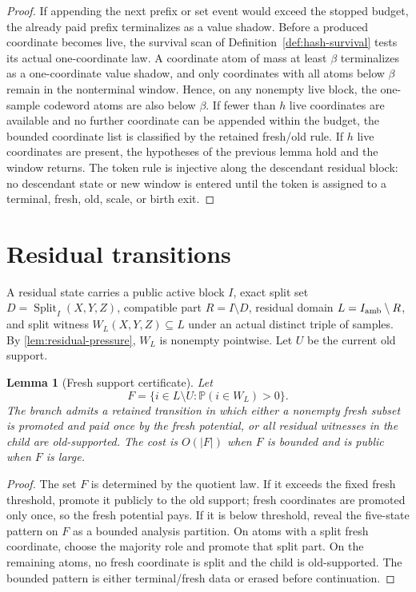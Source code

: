 \documentclass[11pt]{article}
\newcommand{\Cref}[1]{\ref{#1}}
\newtheorem{lemma}[theorem]{Lemma}
\theoremstyle{remark}
\newcommand{\Prob}{\mathbb P}
\newcommand{\Split}{\operatorname{Split}}
\begin{document}
\begin{proof}
If appending the next prefix or set event would exceed the stopped budget, the already paid prefix terminalizes as a value shadow.  Before a produced coordinate becomes live, the survival scan of Definition~\ref{def:hash-survival} tests its actual one-coordinate law.  A coordinate atom of mass at least $\beta$ terminalizes as a one-coordinate value shadow, and only coordinates with all atoms below $\beta$ remain in the nonterminal window.  Hence, on any nonempty live block, the one-sample codeword atoms are also below $\beta$.  If fewer than $h$ live coordinates are available and no further coordinate can be appended within the budget, the bounded coordinate list is classified by the retained fresh/old rule.  If $h$ live coordinates are present, the hypotheses of the previous lemma hold and the window returns.  The token rule is injective along the descendant residual block: no descendant state or new window is entered until the token is assigned to a terminal, fresh, old, scale, or birth exit.
\end{proof}

\section{Residual transitions}\label{app:residual}

A residual state carries a public active block $I$, exact split set $D=\Split_I(X,Y,Z)$, compatible part $R=I\setminus D$, residual domain $L=I_{\rm amb}\setminus R$, and split witness $W_L(X,Y,Z)\subseteq L$ under an actual distinct triple of samples.  By \Cref{lem:residual-pressure}, $W_L$ is nonempty pointwise.  Let $U$ be the current old support.

\begin{lemma}[Fresh support certificate]\label{lem:app-fresh}
Let
\[
        F=\{i\in L\setminus U:\Prob(i\in W_L)>0\}.
\]
The branch admits a retained transition in which either a nonempty fresh subset is promoted and paid once by the fresh potential, or all residual witnesses in the child are old-supported.  The cost is $O(|F|)$ when $F$ is bounded and is public when $F$ is large.
\end{lemma}

\begin{proof}
The set $F$ is determined by the quotient law.  If it exceeds the fixed fresh threshold, promote it publicly to the old support; fresh coordinates are promoted only once, so the fresh potential pays.  If it is below threshold, reveal the five-state pattern on $F$ as a bounded analysis partition.  On atoms with a split fresh coordinate, choose the majority role and promote that split part.  On the remaining atoms, no fresh coordinate is split and the child is old-supported.  The bounded pattern is either terminal/fresh data or erased before continuation.
\end{proof}
\end{document}
